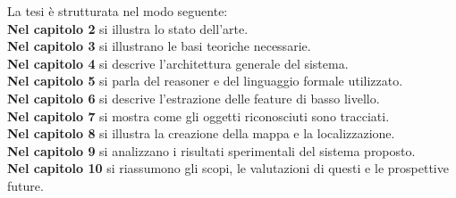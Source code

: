 
\noindent
La tesi è strutturata nel modo seguente: \\
\textbf{Nel capitolo 2} si illustra lo stato dell'arte. \\ 
\textbf{Nel capitolo 3} si illustrano le basi teoriche necessarie. \\
\textbf{Nel capitolo 4} si descrive l'architettura generale del sistema. \\
\textbf{Nel capitolo 5} si parla del reasoner e del linguaggio formale utilizzato. \\
\textbf{Nel capitolo 6} si descrive l'estrazione delle feature di basso livello. \\
\textbf{Nel capitolo 7} si mostra come gli oggetti riconosciuti sono tracciati. \\
\textbf{Nel capitolo 8} si illustra la creazione della mappa e la localizzazione. \\
\textbf{Nel capitolo 9} si analizzano i risultati sperimentali del sistema proposto. \\
\textbf{Nel capitolo 10} si riassumono gli scopi, le valutazioni di questi e le prospettive future. 


